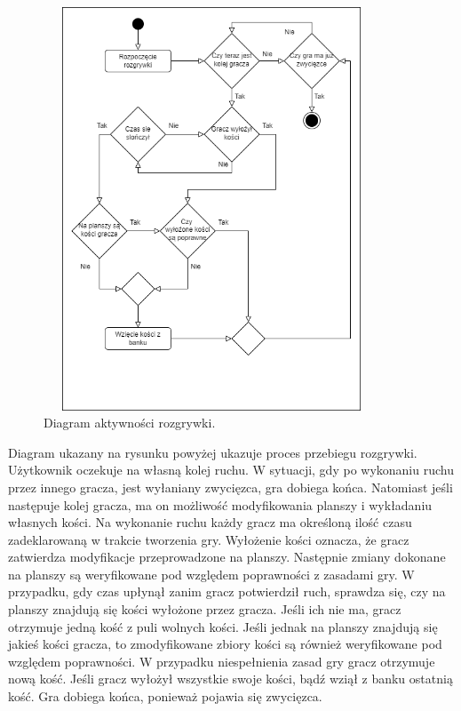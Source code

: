 \begin{figure}[h!]
	\begin{center}
		\includegraphics[width=10cm,height=12cm]{img/activity-diagram-game.png}
	\end{center}
	\caption{{\color{dgray} Diagram aktywności rozgrywki.}} 
	\label{diagram-aktywnosci-game}
\end{figure}  

Diagram ukazany na rysunku powyżej ukazuje proces przebiegu rozgrywki. Użytkownik oczekuje na własną kolej ruchu. W sytuacji, gdy po wykonaniu ruchu przez innego gracza, jest wyłaniany zwycięzca, gra dobiega końca. Natomiast jeśli następuje kolej gracza, ma on możliwość modyfikowania planszy i wykładaniu własnych kości. Na wykonanie ruchu każdy gracz ma określoną ilość czasu zadeklarowaną w trakcie tworzenia gry. Wyłożenie kości oznacza, że gracz zatwierdza modyfikacje przeprowadzone na planszy. Następnie zmiany dokonane na planszy są weryfikowane pod względem poprawności z zasadami gry. W przypadku, gdy czas upłynął zanim gracz potwierdził ruch, sprawdza się, czy na planszy znajdują się kości wyłożone przez gracza. Jeśli ich nie ma, gracz otrzymuje jedną kość z puli wolnych kości. Jeśli jednak na planszy znajdują się jakieś kości gracza, to zmodyfikowane zbiory kości są również weryfikowane pod względem poprawności. W przypadku niespełnienia zasad gry gracz otrzymuje nową kość. Jeśli gracz wyłożył wszystkie swoje kości, bądź wziął z banku ostatnią kość. Gra dobiega końca, ponieważ pojawia się zwycięzca.



